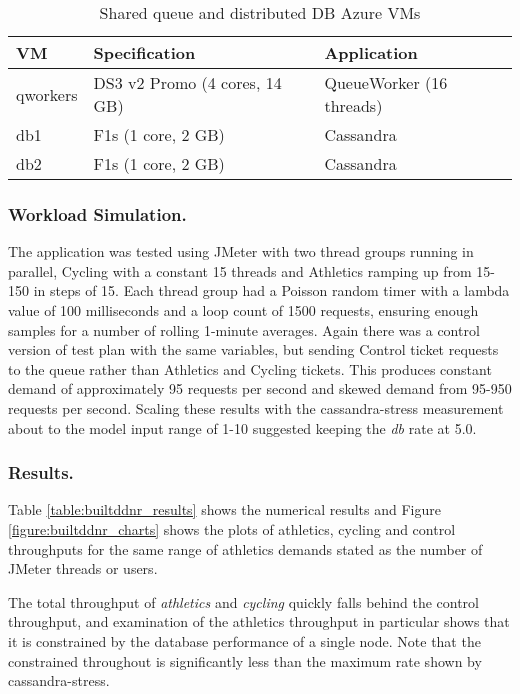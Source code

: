 \begin{table}[h!]
	\begin{center}
		\caption{Shared queue and distributed DB Azure VMs}
		\label{table:builtddnr_vmdesign}
		\begin{tabular}{l | l | l}
			VM		& Specification			& Application \\
			\hline
			qworkers	& DS3 v2 Promo (4 cores, 14 GB)	& QueueWorker (16 threads) \\
			db1		& F1s (1 core, 2 GB)		& Cassandra \\
			db2		& F1s (1 core, 2 GB)		& Cassandra \\
		\end{tabular}
	\end{center}
\end{table}

\subsubsection{Workload Simulation.}  The application was tested using JMeter with two thread groups running in parallel, Cycling with a constant 15 threads and Athletics ramping up from 15-150 in steps of 15.  Each thread group had a Poisson random timer with a lambda value of 100 milliseconds and a loop count of 1500 requests, ensuring enough samples for a number of rolling 1-minute averages.  Again there was a control version of test plan with the same variables, but sending Control ticket requests to the queue rather than Athletics and Cycling tickets.  This produces constant demand of approximately 95 requests per second and skewed demand from 95-950 requests per second.  Scaling these results with the cassandra-stress measurement about to the model input range of 1-10 suggested keeping the {\itshape db} rate at 5.0.

\subsubsection{Results.} 
Table \ref{table:builtddnr_results} shows the numerical results and Figure \ref{figure:builtddnr_charts} shows the plots of athletics, cycling and control throughputs for the same range of athletics demands stated as the number of JMeter threads or users.

The total throughput of {\itshape athletics} and {\itshape cycling} quickly falls behind the control throughput, and examination of the athletics throughput in particular shows that it is constrained by the database performance of a single node.  Note that the constrained throughout is significantly less than the maximum rate shown by cassandra-stress.

